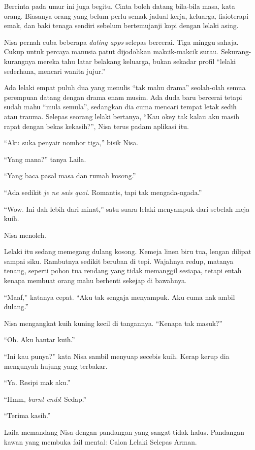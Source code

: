\documentclass[
  11pt,
  a5paper,
  openany,
  oneside]{book}
\begin{document}
Bercinta pada umur ini juga begitu. Cinta boleh datang bila-bila masa,
kata orang. Biasanya orang yang belum perlu semak jadual kerja,
keluarga, fisioterapi emak, dan baki tenaga sendiri sebelum bertemujanji
kopi dengan lelaki asing.

Nisa pernah cuba beberapa \emph{dating apps} selepas bercerai. Tiga
minggu sahaja. Cukup untuk percaya manusia patut dijodohkan
makcik-makcik surau. Sekurang-kurangnya mereka tahu latar belakang
keluarga, bukan sekadar profil ``lelaki sederhana, mencari wanita
jujur.''

Ada lelaki empat puluh dua yang menulis ``tak mahu drama'' seolah-olah
semua perempuan datang dengan drama enam musim. Ada duda baru bercerai
tetapi sudah mahu ``mula semula'', sedangkan dia cuma mencari tempat
letak sedih atau trauma. Selepas seorang lelaki bertanya, ``Kau okey tak
kalau aku masih rapat dengan bekas kekasih?'', Nisa terus padam aplikasi
itu.

``Aku suka penyair nombor tiga,'' bisik Nisa.

``Yang mana?'' tanya Laila.

``Yang baca pasal masa dan rumah kosong.''

``Ada sedikit \emph{je ne sais quoi}. Romantis, tapi tak
mengada-ngada.''

``Wow. Ini dah lebih dari minat,'' satu suara lelaki menyampuk dari
sebelah meja kuih.

Nisa menoleh.

Lelaki itu sedang memegang dulang kosong. Kemeja linen biru tua, lengan
dilipat sampai siku. Rambutnya sedikit beruban di tepi. Wajahnya redup,
matanya tenang, seperti pohon tua rendang yang tidak memanggil sesiapa,
tetapi entah kenapa membuat orang mahu berhenti sekejap di bawahnya.

``Maaf,'' katanya cepat. ``Aku tak sengaja menyampuk. Aku cuma nak ambil
dulang.''

Nisa mengangkat kuih kuning kecil di tangannya. ``Kenapa tak masuk?''

``Oh. Aku hantar kuih.''

``Ini kau punya?'' kata Nisa sambil menyuap secebis kuih. Kerap kerup
dia mengunyah hujung yang terbakar.

``Ya. Resipi mak aku.''

``Hmm, \emph{burnt ends}! Sedap.''

``Terima kasih.''

Laila memandang Nisa dengan pandangan yang sangat tidak halus. Pandangan
kawan yang membuka fail mental: Calon Lelaki Selepas Arman.
\end{document}
